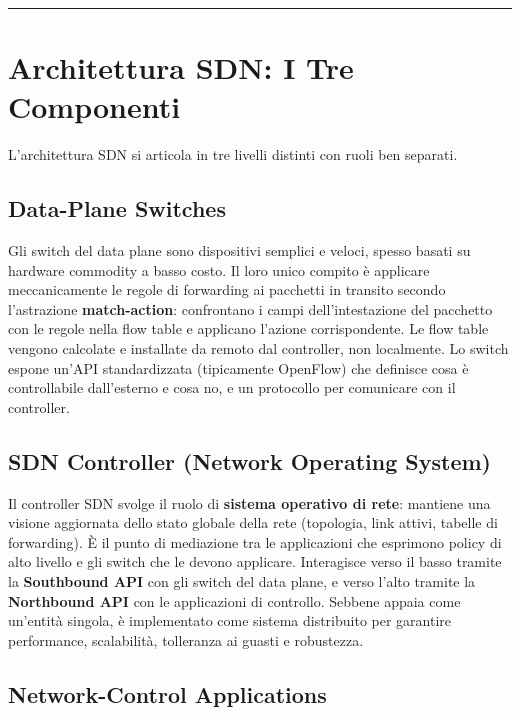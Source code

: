 \documentclass[
  italian,
  openany]{book}
\begin{document}
\begin{center}\rule{0.5\linewidth}{0.5pt}\end{center}

\section{Architettura SDN: I Tre
Componenti}\label{architettura-sdn-i-tre-componenti}

L'architettura SDN si articola in tre livelli distinti con ruoli ben
separati.

\subsection{Data-Plane Switches}\label{data-plane-switches}

Gli switch del data plane sono dispositivi semplici e veloci, spesso
basati su hardware commodity a basso costo. Il loro unico compito è
applicare meccanicamente le regole di forwarding ai pacchetti in
transito secondo l'astrazione \textbf{match-action}: confrontano i campi
dell'intestazione del pacchetto con le regole nella flow table e
applicano l'azione corrispondente. Le flow table vengono calcolate e
installate da remoto dal controller, non localmente. Lo switch espone
un'API standardizzata (tipicamente OpenFlow) che definisce cosa è
controllabile dall'esterno e cosa no, e un protocollo per comunicare con
il controller.

\subsection{SDN Controller (Network Operating
System)}\label{sdn-controller-network-operating-system}

Il controller SDN svolge il ruolo di \textbf{sistema operativo di rete}:
mantiene una visione aggiornata dello stato globale della rete
(topologia, link attivi, tabelle di forwarding). È il punto di
mediazione tra le applicazioni che esprimono policy di alto livello e
gli switch che le devono applicare. Interagisce verso il basso tramite
la \textbf{Southbound API} con gli switch del data plane, e verso l'alto
tramite la \textbf{Northbound API} con le applicazioni di controllo.
Sebbene appaia come un'entità singola, è implementato come sistema
distribuito per garantire performance, scalabilità, tolleranza ai guasti
e robustezza.

\subsection{Network-Control
Applications}\label{network-control-applications}
\end{document}
